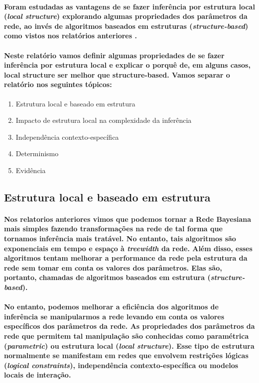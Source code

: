 \documentclass[a4paper,10pt]{article}
\theoremstyle{plain}
\begin{document}
\paragraph{
  Foram estudadas as vantagens de se fazer inferência por estrutura local (\textit{local structure})
  explorando algumas propriedades dos parâmetros da rede, ao invés de algoritmos baseados em
  estruturas (\textit{structure-based}) como vistos nos relatórios anteriores\cite{report-2}
  \cite{report-5}.
}

\paragraph{
  Neste relatório vamos definir algumas propriedades de se fazer inferência por estrutura local e
  explicar o porquê de, em alguns casos, local structure ser melhor que structure-based. Vamos
  separar o relatório nos seguintes tópicos:
}

\begin{enumerate}
  \item Estrutura local e baseado em estrutura
  \item Impacto de estrutura local na complexidade da inferência
  \item Independência contexto-específica
  \item Determinismo
  \item Evidência
\end{enumerate}

\subsection{Estrutura local e baseado em estrutura}

\paragraph{
  Nos relatorios anteriores vimos que podemos tornar a Rede Bayesiana mais simples fazendo
  transformações na rede de tal forma que tornamos inferência mais  tratável. No entanto, tais
  algoritmos são exponenciais em tempo e espaço à \textit{treewidth}\cite{report-5} da rede. Além
  disso, esses algoritmos tentam melhorar a performance da rede pela estrutura da rede sem tomar em
  conta os valores dos parâmetros. Elas são, portanto, chamadas de algoritmos baseados em estrutura
  (\textit{structure-based}).
}

\paragraph{
  No entanto, podemos melhorar a eficiência dos algoritmos de inferência se manipularmos a rede
  levando em conta os valores específicos dos parâmetros da rede. As propriedades dos parâmetros
  da rede que permitem tal manipulação são conhecidas como paramétrica (\textit{parametric}) ou
  estrutura local (\textit{local structure}). Esse tipo de estrutura normalmente se manifestam em
  redes que envolvem restrições lógicas (\textit{logical constraints}), independência
  contexto-específica ou modelos locais de interação.
}
\end{document}
